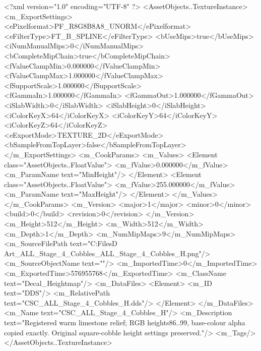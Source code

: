 <?xml version="1.0" encoding="UTF-8" ?>
<AssetObjects..TextureInstance>
	<m_ExportSettings>
		<ePixelformat>PF_R8G8B8A8_UNORM</ePixelformat>
		<eFilterType>FT_B_SPLINE</eFilterType>
		<bUseMips>true</bUseMips>
		<iNumManualMips>0</iNumManualMips>
		<bCompleteMipChain>true</bCompleteMipChain>
		<fValueClampMin>0.000000</fValueClampMin>
		<fValueClampMax>1.000000</fValueClampMax>
		<fSupportScale>1.000000</fSupportScale>
		<fGammaIn>1.000000</fGammaIn>
		<fGammaOut>1.000000</fGammaOut>
		<iSlabWidth>0</iSlabWidth>
		<iSlabHeight>0</iSlabHeight>
		<iColorKeyX>64</iColorKeyX>
		<iColorKeyY>64</iColorKeyY>
		<iColorKeyZ>64</iColorKeyZ>
		<eExportMode>TEXTURE_2D</eExportMode>
		<bSampleFromTopLayer>false</bSampleFromTopLayer>
	</m_ExportSettings>
	<m_CookParams>
		<m_Values>
			<Element class="AssetObjects..FloatValue">
				<m_fValue>0.000000</m_fValue>
				<m_ParamName text="MinHeight"/>
			</Element>
			<Element class="AssetObjects..FloatValue">
				<m_fValue>255.000000</m_fValue>
				<m_ParamName text="MaxHeight"/>
			</Element>
		</m_Values>
	</m_CookParams>
	<m_Version>
		<major>1</major>
		<minor>0</minor>
		<build>0</build>
		<revision>0</revision>
	</m_Version>
	<m_Height>512</m_Height>
	<m_Width>512</m_Width>
	<m_Depth>1</m_Depth>
	<m_NumMipMaps>9</m_NumMipMaps>
	<m_SourceFilePath text="C:\Users\Shadow\Desktop\Working Files\3D Art\Decals\CSC_ALL_Stage_4_Cobbles\CSC_ALL_Stage_4_Cobbles_H.png"/>
	<m_SourceObjectName text=""/>
	<m_ImportedTime>0</m_ImportedTime>
	<m_ExportedTime>576955768</m_ExportedTime>
	<m_ClassName text="Decal_Heightmap"/>
	<m_DataFiles>
		<Element>
			<m_ID text="DDS"/>
			<m_RelativePath text="CSC_ALL_Stage_4_Cobbles_H.dds"/>
		</Element>
	</m_DataFiles>
	<m_Name text="CSC_ALL_Stage_4_Cobbles_H"/>
	<m_Description text="Registered warm limestone relief; RGB heights86..99, base-colour alpha copied exactly. Original square-cobble height settings preserved."/>
	<m_Tags/>
</AssetObjects..TextureInstance>

